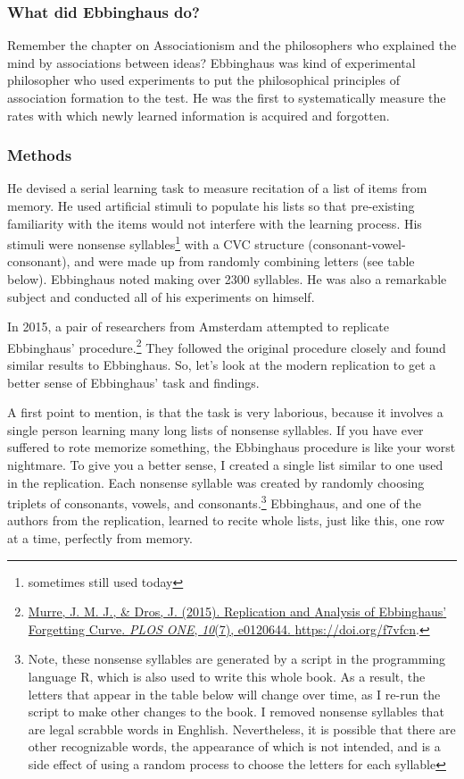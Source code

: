 \documentclass[
  oneside,
  12pt]{crumpbook}
\begin{document}
\hypertarget{what-did-ebbinghaus-do}{%
\subsubsection{What did Ebbinghaus do?}\label{what-did-ebbinghaus-do}}

Remember the chapter on Associationism and the philosophers who explained the mind by associations between ideas? Ebbinghaus was kind of experimental philosopher who used experiments to put the philosophical principles of association formation to the test. He was the first to systematically measure the rates with which newly learned information is acquired and forgotten.

\hypertarget{methods}{%
\subsubsection{Methods}\label{methods}}

He devised a serial learning task to measure recitation of a list of items from memory. He used artificial stimuli to populate his lists so that pre-existing familiarity with the items would not interfere with the learning process. His stimuli were nonsense syllables\footnote{sometimes still used today} with a CVC structure (consonant-vowel-consonant), and were made up from randomly combining letters (see table below). Ebbinghaus noted making over 2300 syllables. He was also a remarkable subject and conducted all of his experiments on himself.

In 2015, a pair of researchers from Amsterdam attempted to replicate Ebbinghaus' procedure.\footnote{\protect\hyperlink{ref-murreReplicationAnalysisEbbinghaus2015}{Murre, J. M. J., \& Dros, J. (2015). Replication and {Analysis} of {Ebbinghaus}' {Forgetting Curve}. \emph{PLOS ONE}, \emph{10}(7), e0120644. \url{https://doi.org/f7vfcn}}.} They followed the original procedure closely and found similar results to Ebbinghaus. So, let's look at the modern replication to get a better sense of Ebbinghaus' task and findings.

A first point to mention, is that the task is very laborious, because it involves a single person learning many long lists of nonsense syllables. If you have ever suffered to rote memorize something, the Ebbinghaus procedure is like your worst nightmare. To give you a better sense, I created a single list similar to one used in the replication. Each nonsense syllable was created by randomly choosing triplets of consonants, vowels, and consonants.\footnote{Note, these nonsense syllables are generated by a script in the programming language R, which is also used to write this whole book. As a result, the letters that appear in the table below will change over time, as I re-run the script to make other changes to the book. I removed nonsense syllables that are legal scrabble words in Enghlish. Nevertheless, it is possible that there are other recognizable words, the appearance of which is not intended, and is a side effect of using a random process to choose the letters for each syllable} Ebbinghaus, and one of the authors from the replication, learned to recite whole lists, just like this, one row at a time, perfectly from memory.
\end{document}
